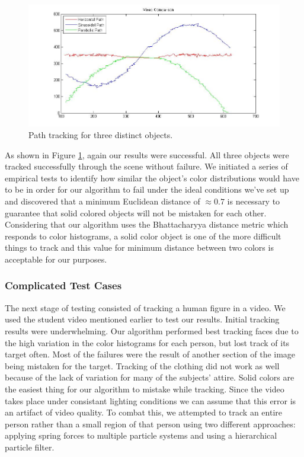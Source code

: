 \documentclass[11pt]{article}
\begin{document}
\begin{figure}[H]
\centering
\includegraphics[scale=0.45]{img/MixedComparison.jpg}
\caption{Path tracking for three distinct objects.}
\label{fig:MultipleTracking}
\end{figure}

As shown in Figure \ref{fig:MultipleTracking}, again our results were successful.  All three objects were tracked successfully through the scene without failure.  We initiated a series of empirical tests to identify how similar the object's color distributions would have to be in order for our algorithm to fail under the ideal conditions we've set up and discovered that a minimum Euclidean distance of $\approx 0.7$ is necessary to guarantee that solid colored objects will not be mistaken for each other.  Considering that our algorithm uses the Bhattacharyya distance metric which responds to color histograms, a solid color object is one of the more difficult things to track and this value for minimum distance between two colors is acceptable for our purposes.  

\subsubsection{Complicated Test Cases}

The next stage of testing consisted of tracking a human figure in a video.  We used the student video mentioned earlier to test our results.  Initial tracking results were underwhelming.  Our algorithm performed best tracking faces due to the high variation in the color histograms for each person, but lost track of its target often.  Most of the failures were the result of another section of the image being mistaken for the target.  Tracking of the clothing did not work as well because of the lack of variation for many of the subjects' attire.  Solid colors are the easiest thing for our algorithm to mistake while tracking.  Since the video takes place under consistant lighting conditions we can assume that this error is an artifact of video quality.  To combat this, we attempted to track an entire person rather than a small region of that person using two different approaches: applying spring forces to multiple particle systems and using a hierarchical particle filter.  
\end{document}
